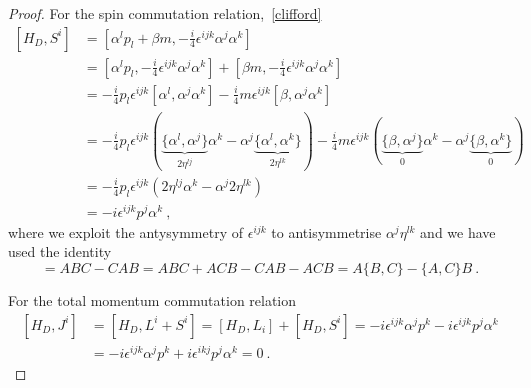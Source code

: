 \begin{proof}
        For the spin commutation relation,~\eqref{clifford}
        \begin{equation*}
        \begin{aligned}
            [H_D, S^i] & = [\alpha^l p_l + \beta m, -\frac{i}{4} \epsilon^{ijk} \alpha^j \alpha^k] \\ & = [\alpha^l p_l, -\frac{i}{4} \epsilon^{ijk} \alpha^j \alpha^k] + [\beta m, -\frac{i}{4} \epsilon^{ijk} \alpha^j \alpha^k] \\ & =  -\frac{i}{4} p_l \epsilon^{ijk} [\alpha^l, \alpha^j \alpha^k] -\frac{i}{4} m \epsilon^{ijk}  [\beta, \alpha^j \alpha^k] \\ & = -\frac{i}{4} p_l \epsilon^{ijk} (\underbrace{\{\alpha^l, \alpha^j\}}_{2\eta^{lj}} \alpha^k - \alpha^j \underbrace{\{\alpha^l, \alpha^k\}}_{2\eta^{lk}}) - \frac{i}{4} m \epsilon^{ijk} (\underbrace{\{\beta, \alpha^j\}}_0 \alpha^k - \alpha^j \underbrace{\{\beta, \alpha^k\}}_0) \\ & = -\frac{i}{4} p_l \epsilon^{ijk} (2\eta^{lj} \alpha^k - \alpha^j 2\eta^{lk}) \\ & = - i \epsilon^{ijk} p^j \alpha^k ~,
        \end{aligned}
        \end{equation*}
        where we exploit the antysymmetry of $\epsilon^{ijk}$ to antisymmetrise $\alpha^j \eta^{lk}$ and we have used the identity 
        \begin{equation*}
            [AB,C] = ABC - CAB = ABC + ACB - CAB - ACB = A \{B, C\} - \{A, C\} B ~.
        \end{equation*}

        For the total momentum commutation relation 
        \begin{equation*}
        \begin{aligned}
            [H_D, J^i] & = [H_D, L^i + S^i] = [H_D, L_i] + [H_D, S^i] = - i \epsilon^{ijk} \alpha^j p^k - i \epsilon^{ijk} p^j \alpha^k \\ & = - i \epsilon^{ijk} \alpha^j p^k + i \epsilon^{ikj} p^j \alpha^k = 0 ~.
        \end{aligned}
        \end{equation*}
    \end{proof}

